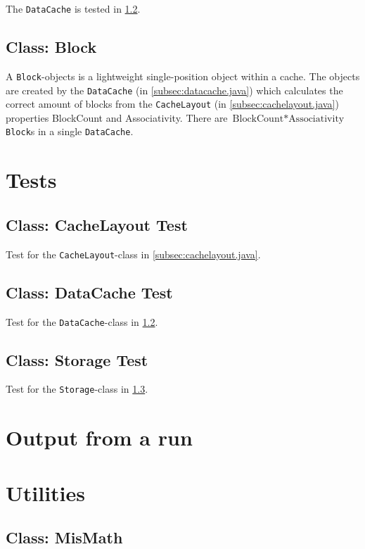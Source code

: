 \documentclass[a4paper]{scrreprt}
\begin{document}
The \texttt{DataCache} is tested in \ref{subsec:datacachetest.java}.



\subsection{Class: Block}
\label{subsec:block.java}

A \texttt{Block}-objects is a lightweight single-position object within a cache. The objects are created by the \texttt{DataCache} (in \ref{subsec:datacache.java}) which calculates the correct amount of blocks from the \texttt{CacheLayout} (in \ref{subsec:cachelayout.java}) properties BlockCount and Associativity. There are $\text{BlockCount} * \text{Associativity}$ \texttt{Block}s in a single \texttt{DataCache}.



\section{Tests}

\subsection{Class: CacheLayout Test}
\label{subsec:cachelayouttest.java}

Test for the \texttt{CacheLayout}-class in \ref{subsec:cachelayout.java}.



\subsection{Class: DataCache Test}
\label{subsec:datacachetest.java}

Test for the \texttt{DataCache}-class in \ref{subsec:datacachetest.java}.



\subsection{Class: Storage Test}
\label{subsec:storagetest.java}

Test for the \texttt{Storage}-class in \ref{subsec:storagetest.java}.



\section{Output from a run}


\section{Utilities}

\subsection{Class: MisMath}
\label{subsec:mismath.java}

\end{document}
